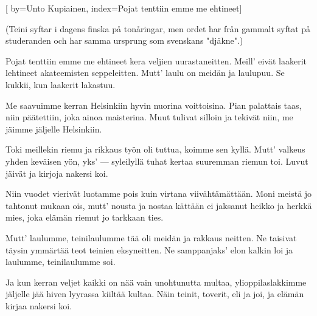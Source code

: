 [
by={Unto Kupiainen},
index={Pojat tenttiin emme me ehtineet}]

\beginverse* 
(Teini syftar i dagens finska på tonåringar, men ordet har från gammalt syftat
på studeranden och har samma ursprung som svenskans "djäkne".)
\endverse

\beginverse* 
Pojat tenttiin emme me ehtineet
kera veljien uurastaneitten.
Meill' eivät laakerit lehtineet
akateemisten seppeleitten.
Mutt' laulu on meidän ja laulupuu.
Se kukkii, kun laakerit lakastuu.
\endverse

\beginverse* 
Me saavuimme kerran Helsinkiin
hyvin nuorina voittoisina.
Pian palattais taas, niin päätettiin,
joka ainoa maisterina.
Muut tulivat silloin ja tekivät niin,
me jäimme jäljelle Helsinkiin.
\endverse

\beginverse* 
Toki meillekin riemu ja rikkaus työn
oli tuttua, koimme sen kyllä.
Mutt' valkeus yhden keväisen yön,
yks' --- syleilyllä
tuhat kertaa suuremman riemun toi.
Luvut jäivät ja kirjoja nakersi koi.
\endverse

\beginverse* 
Niin vuodet vierivät luotamme pois
kuin virtana viivähtämättään.
Moni meistä jo tahtonut mukaan ois,
mutt' nousta ja nostaa kättään
ei jaksanut heikko ja herkkä mies,
joka elämän riemut jo tarkkaan ties.
\endverse

\beginverse* 
Mutt' laulumme, teinilaulumme tää
oli meidän ja rakkaus neitten.
Ne taisivat täysin ymmärtää
teot teinien eksyneitten.
Ne samppanjaks' elon kalkin loi
ja laulumme, teinilaulumme soi.
\endverse

\beginverse* 
Ja kun kerran veljet kaikki on nää
vain unohtunutta multaa,
ylioppilaslakkimme jäljelle jää
hiven lyyrassa kiiltää kultaa.
Näin teinit, toverit, eli ja joi,
ja elämän kirjaa nakersi koi.
\endverse
\endsong



